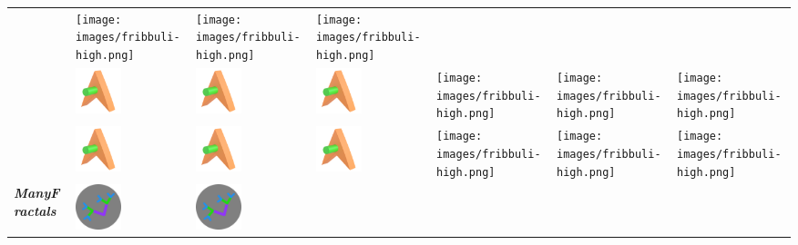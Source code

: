 \documentclass[
  letterpaper,
  DIV=11,
  numbers=noendperiod,
  oneside]{scrreprt}
\begin{document}
\begin{longtable}[]{@{}lllllll@{}}
&
\texttt{[image: images/fribbuli-high.png]}
&
\texttt{[image: images/fribbuli-high.png]}
&
\texttt{[image: images/fribbuli-high.png]} \\
&
\includegraphics[width=\linewidth,height=0.52083in,keepaspectratio]{images/fribbuli-low.png}
&
\includegraphics[width=\linewidth,height=0.52083in,keepaspectratio]{images/fribbuli-low.png}
&
\includegraphics[width=\linewidth,height=0.52083in,keepaspectratio]{images/fribbuli-low.png}
&
\texttt{[image: images/fribbuli-high.png]}
&
\texttt{[image: images/fribbuli-high.png]}
&
\texttt{[image: images/fribbuli-high.png]} \\
&
\includegraphics[width=\linewidth,height=0.52083in,keepaspectratio]{images/fribbuli-low.png}
&
\includegraphics[width=\linewidth,height=0.52083in,keepaspectratio]{images/fribbuli-low.png}
&
\includegraphics[width=\linewidth,height=0.52083in,keepaspectratio]{images/fribbuli-low.png}
&
\texttt{[image: images/fribbuli-high.png]}
&
\texttt{[image: images/fribbuli-high.png]}
&
\texttt{[image: images/fribbuli-high.png]} \\
\multirow{4}{=}{\textbf{\emph{ManyFractals}}} &
\includegraphics[width=\linewidth,height=0.52083in,keepaspectratio]{images/fractal-low.png}
&
\includegraphics[width=\linewidth,height=0.52083in,keepaspectratio]{images/fractal-low.png}

\end{longtable}
\end{document}
